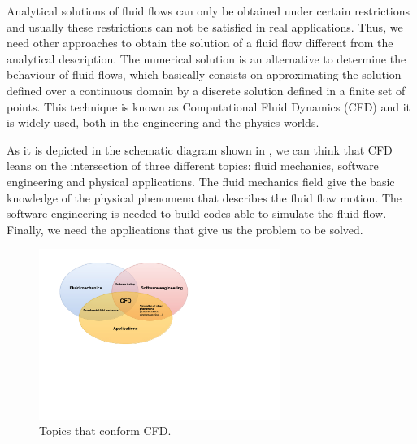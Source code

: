 Analytical solutions of fluid flows can only be obtained under certain restrictions and usually these restrictions can not be satisfied in real applications. Thus, we need other approaches to obtain the solution of a fluid flow different from the analytical description. The numerical solution is an alternative to determine the behaviour of fluid flows, which basically consists on approximating the solution defined over a continuous domain by a discrete solution defined in a finite set of points. This technique is known as Computational Fluid Dynamics (CFD) and it is widely used, both in the engineering and the physics worlds.

As it is depicted in the schematic diagram shown in , we can think that CFD leans on the intersection of three different topics: fluid mechanics, software engineering and physical applications. The fluid mechanics field give the basic knowledge of the physical phenomena that describes the fluid flow motion. The software engineering is needed to build codes able to simulate the fluid flow. Finally, we need the applications that give us the problem to be solved.

\begin{figure}[h!]
	\centering	
	\includegraphics[trim=2cm 9cm 11cm 1cm,clip=true,width=0.7\textwidth]{Figures/Chapter1/CFD_scheme}
	\caption{Topics that conform CFD.}
	\label{fig-CFD}
\end{figure}

